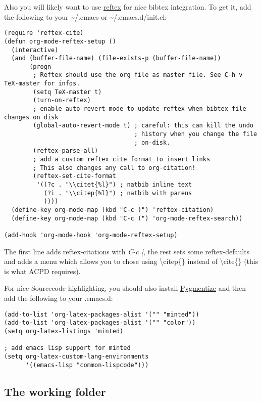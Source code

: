 \documentclass[11pt]{article}
\begin{document}
Also you will likely want to use \href{http://www.gnu.org/software/auctex/reftex.html}{reftex} for nice bibtex integration. To get it, add the following to your \textasciitilde{}/.emacs or \textasciitilde{}/.emacs.d/init.el:

\begin{verbatim}
(require 'reftex-cite)
(defun org-mode-reftex-setup ()
  (interactive)
  (and (buffer-file-name) (file-exists-p (buffer-file-name))
       (progn
        ; Reftex should use the org file as master file. See C-h v TeX-master for infos.
        (setq TeX-master t)
        (turn-on-reftex)
        ; enable auto-revert-mode to update reftex when bibtex file changes on disk
        (global-auto-revert-mode t) ; careful: this can kill the undo
                                    ; history when you change the file
                                    ; on-disk.
        (reftex-parse-all)
        ; add a custom reftex cite format to insert links
        ; This also changes any call to org-citation!
        (reftex-set-cite-format
         '((?c . "\\citet{%l}") ; natbib inline text
           (?i . "\\citep{%l}") ; natbib with parens
           ))))
  (define-key org-mode-map (kbd "C-c )") 'reftex-citation)
  (define-key org-mode-map (kbd "C-c (") 'org-mode-reftex-search))

(add-hook 'org-mode-hook 'org-mode-reftex-setup)
\end{verbatim}


The first line adds reftex-citations with \emph{C-c [}, the rest sets some reftex-defaults and adds a menu which allows you to chose using \textbackslash citep\{\} instead of \textbackslash cite\{\} (this is what ACPD requires).

For nice Sourcecode highlighting, you should also install \href{http://pygments.org/}{Pygmentize} and then add the following to your .emacs.d:

\begin{verbatim}
(add-to-list 'org-latex-packages-alist '("" "minted"))
(add-to-list 'org-latex-packages-alist '("" "color"))
(setq org-latex-listings 'minted)

; add emacs lisp support for minted
(setq org-latex-custom-lang-environments
      '((emacs-lisp "common-lispcode")))
\end{verbatim}


\subsection*{The working folder}
\label{sec-2-2}
\end{document}

